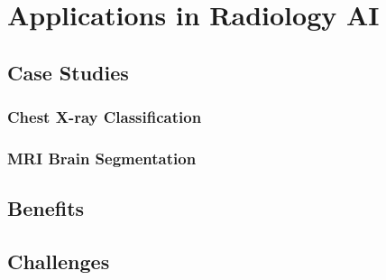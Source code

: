 \section{Applications in Radiology AI}


\subsection{Case Studies}

\subsubsection{Chest X-ray Classification}

\subsubsection{MRI Brain Segmentation}

\subsection{Benefits}

\subsection{Challenges}

